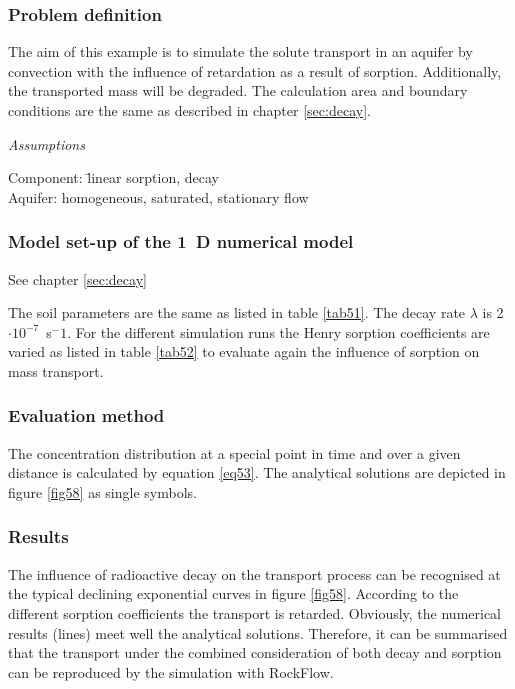 \subsubsection*{Problem definition}

The aim of this example is to simulate the solute transport in an aquifer by convection with the influence of retardation as a result of sorption. Additionally, the transported mass will be degraded. The calculation area and boundary conditions are the same as described in chapter \ref{sec:decay}.


\textsl{Assumptions}

\begin{tabbing}
Component: \= linear sorption, decay \\
Aquifer: \> homogeneous, saturated, stationary flow \\
\end{tabbing}

\subsubsection*{Model set-up of the 1~D numerical model}

See chapter \ref{sec:decay}

The soil parameters are the same as listed in table \ref{tab51}. The decay rate $\lambda$ is 2$\cdot 10^{-7}$~s$^-1$. For the different simulation runs the Henry sorption coefficients are varied as listed in table \ref{tab52} to evaluate again the influence of sorption on mass transport.

\subsubsection*{Evaluation method}
The concentration distribution at a special point in time and over a given distance is calculated by equation \ref{eq53}. The analytical solutions are depicted in figure \ref{fig58} as single symbols.

\subsubsection*{Results}

The influence of radioactive decay on the transport process can be recognised at the typical declining exponential curves in figure \ref{fig58}. According to the different sorption coefficients the transport is retarded. Obviously, the numerical results (lines) meet well the analytical solutions. Therefore, it can be summarised that the transport under the combined consideration of both decay and sorption can be reproduced by the simulation with RockFlow.


